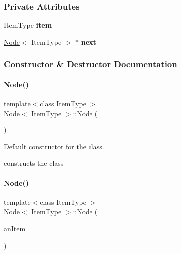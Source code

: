 \subsubsection*{Private Attributes}
\begin{DoxyCompactItemize}
\item 
\hypertarget{class_node_a73e84414314067aa019ba6afb06190bd}{}\label{class_node_a73e84414314067aa019ba6afb06190bd} 
Item\+Type {\bfseries item}
\item 
\hypertarget{class_node_ad11288556b42a32b4f46ed955b7c31fd}{}\label{class_node_ad11288556b42a32b4f46ed955b7c31fd} 
\hyperlink{class_node}{Node}$<$ Item\+Type $>$ $\ast$ {\bfseries next}
\end{DoxyCompactItemize}


\subsubsection{Constructor \& Destructor Documentation}
\hypertarget{class_node_a627e94f4fba0e73c546e0fb2a7266f36}{}\label{class_node_a627e94f4fba0e73c546e0fb2a7266f36} 
\paragraph{\texorpdfstring{Node()}{Node()}\hspace{0.1cm}{\footnotesize\ttfamily [1/2]}}
{\footnotesize\ttfamily template$<$class Item\+Type $>$ \\
\hyperlink{class_node}{Node}$<$ Item\+Type $>$\+::\hyperlink{class_node}{Node} (\begin{DoxyParamCaption}{ }\end{DoxyParamCaption})}



Default constructor for the class. 

constructs the class \hypertarget{class_node_a0288598fcb0244739ce95099c26250ae}{}\label{class_node_a0288598fcb0244739ce95099c26250ae} 
\paragraph{\texorpdfstring{Node()}{Node()}\hspace{0.1cm}{\footnotesize\ttfamily [2/2]}}
{\footnotesize\ttfamily template$<$class Item\+Type $>$ \\
\hyperlink{class_node}{Node}$<$ Item\+Type $>$\+::\hyperlink{class_node}{Node} (\begin{DoxyParamCaption}\item[{const Item\+Type \&}]{an\+Item }\end{DoxyParamCaption})}




